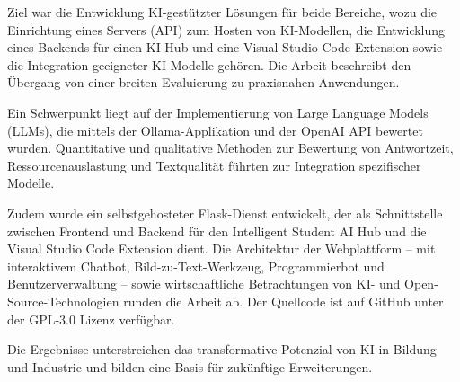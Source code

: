 {Ziel war die Entwicklung KI-gestützter Lösungen für beide Bereiche, wozu die Einrichtung eines Servers (API) zum Hosten von KI-Modellen, die Entwicklung eines Backends für einen KI-Hub und eine Visual Studio Code Extension sowie die Integration geeigneter KI-Modelle gehören. Die Arbeit beschreibt den Übergang von einer breiten Evaluierung zu praxisnahen Anwendungen.
    
Ein Schwerpunkt liegt auf der Implementierung von Large Language Models (LLMs), die mittels der Ollama-Applikation und der OpenAI API bewertet wurden. Quantitative und qualitative Methoden zur Bewertung von Antwortzeit, Ressourcenauslastung und Textqualität führten zur Integration spezifischer Modelle.
    
Zudem wurde ein selbstgehosteter Flask-Dienst entwickelt, der als Schnittstelle zwischen Frontend und Backend für den Intelligent Student AI Hub und die Visual Studio Code Extension dient. Die Architektur der Webplattform – mit interaktivem Chatbot, Bild-zu-Text-Werkzeug, Programmierbot und Benutzerverwaltung – sowie wirtschaftliche Betrachtungen von KI- und Open-Source-Technologien runden die Arbeit ab. Der Quellcode ist auf GitHub unter der GPL-3.0 Lizenz verfügbar.
    
Die Ergebnisse unterstreichen das transformative Potenzial von KI in Bildung und Industrie und bilden eine Basis für zukünftige Erweiterungen.    
}